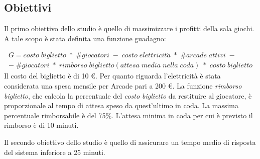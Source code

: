 \documentclass{article}
\begin{document}
\subsection{Obiettivi}
\label{Goal}
\par Il primo obiettivo dello studio è quello di massimizzare i profitti della sala giochi. A tale scopo è stata definita una funzione guadagno:

\begin{equation}
\begin{split}
   G = costo\; biglietto \;*\; \#giocatori\; -\; costo\; elettricit\grave a \;*\; \#arcade \;attivi\; - \\-\; \#giocatori \;*\; rimborso \;biglietto(attesa\;media\;nella\;coda)\;*\;costo\;biglietto
\end{split}
\end{equation}
Il costo del biglietto è di 10 \euro . Per quanto riguarda l'elettricità è stata considerata una spesa mensile per Arcade pari a 200 \euro. La funzione \textit{rimborso biglietto}, che calcola la percentuale del \textit{costo biglietto} da restituire al giocatore, è proporzionale al tempo di attesa speso da quest'ultimo in coda. La massima percentuale rimborsabile è del 75\%. L'attesa minima in coda per cui è previsto il rimborso è di 10 minuti. 
\\
\par Il secondo obiettivo dello studio è quello di assicurare un tempo medio di risposta del sistema inferiore a 25 minuti.



	
\end{document}
